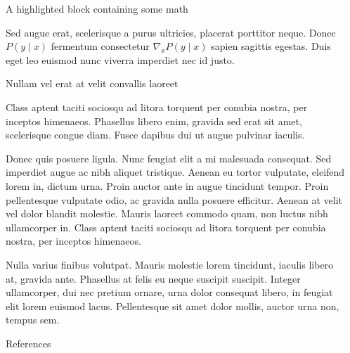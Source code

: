 \documentclass[final]{beamer}
\newlength{\sepwidth}
\newlength{\colwidth}
\newcommand{\separatorcolumn}{\begin{column}{\sepwidth}\end{column}}
\begin{document}
\begin{frame}[t]
\begin{columns}[t]
\begin{column}{\colwidth}
\begin{exampleblock}{A highlighted block containing some math}

    Sed augue erat, scelerisque a purus ultricies, placerat porttitor neque.
    Donec $P(y \mid x)$ fermentum consectetur $\nabla_x P(y \mid x)$ sapien
    sagittis egestas. Duis eget leo euismod nunc viverra imperdiet nec id
    justo.

  \end{exampleblock}

  \begin{block}{Nullam vel erat at velit convallis laoreet}

    Class aptent taciti sociosqu ad litora torquent per conubia nostra, per
    inceptos himenaeos. Phasellus libero enim, gravida sed erat sit amet,
    scelerisque congue diam. Fusce dapibus dui ut augue pulvinar iaculis.



    Donec quis posuere ligula. Nunc feugiat elit a mi malesuada consequat. Sed
    imperdiet augue ac nibh aliquet tristique. Aenean eu tortor vulputate,
    eleifend lorem in, dictum urna. Proin auctor ante in augue tincidunt
    tempor. Proin pellentesque vulputate odio, ac gravida nulla posuere
    efficitur. Aenean at velit vel dolor blandit molestie. Mauris laoreet
    commodo quam, non luctus nibh ullamcorper in. Class aptent taciti sociosqu
    ad litora torquent per conubia nostra, per inceptos himenaeos.

    Nulla varius finibus volutpat. Mauris molestie lorem tincidunt, iaculis
    libero at, gravida ante. Phasellus at felis eu neque suscipit suscipit.
    Integer ullamcorper, dui nec pretium ornare, urna dolor consequat libero,
    in feugiat elit lorem euismod lacus. Pellentesque sit amet dolor mollis,
    auctor urna non, tempus sem.

  \end{block}

  \begin{block}{References}

    \nocite{*}
    \footnotesize{}

  \end{block}

\end{column}

\separatorcolumn
\end{columns}
\end{frame}
\end{document}

